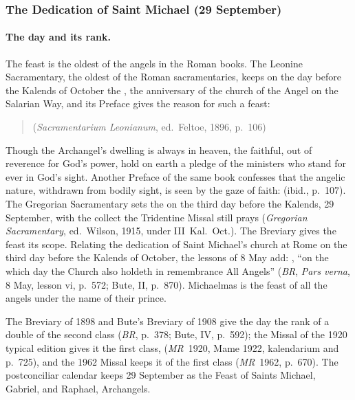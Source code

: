 \subsubsection{The Dedication of Saint Michael (29 September)}

\paragraph{The day and its rank.} The feast is the oldest of the angels
in the Roman books. The Leonine Sacramentary, the oldest of the Roman
sacramentaries, keeps on the day before the Kalends of October the
, the anniversary of the church
of the Angel on the Salarian Way, and its Preface gives the reason for
such a feast:
\begin{quote}
 (\emph{Sacramentarium Leonianum}, ed.\ Feltoe, 1896,
p.~106)
\end{quote}
Though the Archangel's dwelling is always in heaven, the faithful, out of
reverence for God's power, hold on earth a pledge of the ministers who
stand for ever in God's sight. Another Preface of the same book confesses that the
angelic nature, withdrawn from bodily sight, is seen by the gaze of
faith:
 (ibid., p.~107). The Gregorian Sacramentary sets the
 on the third day before the
Kalends, 29 September, with the collect the Tridentine Missal still
prays (\emph{Gregorian Sacramentary}, ed.\ Wilson, 1915, under
III~Kal.\ Oct.). The Breviary gives the feast its scope. Relating the
dedication of Saint Michael's church at Rome on the third day before the
Kalends of October, the lessons of 8 May add: , ``on the which day the
Church also holdeth in remembrance All Angels'' (\emph{BR}, \emph{Pars
verna}, 8 May, lesson vi, p.~572; Bute, II, p.~870). Michaelmas is the
feast of all the angels under the name of their prince.

The Breviary of 1898 and Bute's Breviary of 1908 give the day the rank of
a double of the second class (\emph{BR}, p.~378; Bute, IV, p.~592); the
Missal of the 1920 typical edition gives it the first class,  (\emph{MR}~1920, Mame 1922, kalendarium and p.~725), and the
1962 Missal keeps it of the first class (\emph{MR}~1962, p.~670). The
postconciliar calendar keeps 29 September as the Feast of Saints Michael,
Gabriel, and Raphael, Archangels.

